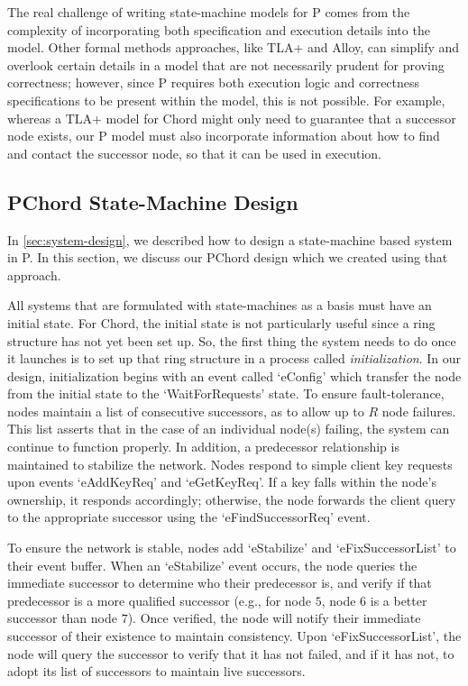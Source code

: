 \documentclass[conference]{IEEEtran}
\begin{document}
The real challenge of writing state-machine models for P comes from the complexity of incorporating both specification and execution details into the model. Other formal methods approaches, like TLA+ and Alloy, can simplify and overlook certain details in a model that are not necessarily prudent for proving correctness; however, since P requires both execution logic and correctness specifications to be present within the model, this is not possible. For example, whereas a TLA+ model for Chord might only need to guarantee that a successor node exists, our P model must also incorporate information about how to find and contact the successor node, so that it can be used in execution. 

\subsection{PChord State-Machine Design}
In \autoref{sec:system-design}, we described how to design a state-machine based system in P. In this section, we discuss our PChord design which we created using that approach.


All systems that are formulated with state-machines as a basis must have an initial state. For Chord, the initial state is not particularly useful since a ring structure has not yet been set up. So, the first thing the system needs to do once it launches is to set up that ring structure in a process called \textit{initialization}. In our design, initialization begins with an event called `eConfig' which transfer the node from the initial state to the `WaitForRequests' state. To ensure fault-tolerance, nodes maintain a list of consecutive successors, as to allow up to $R$ node failures. This list asserts that in the case of an individual node(s) failing, the system can continue to function properly. In addition, a predecessor relationship is maintained to stabilize the network. Nodes respond to simple client key requests upon events `eAddKeyReq' and `eGetKeyReq'. If a key falls within the node's ownership, it responds accordingly; otherwise, the node forwards the client query to the appropriate successor using the `eFindSuccessorReq' event. 

To ensure the network is stable, nodes add `eStabilize' and `eFixSuccessorList' to their event buffer. When an `eStabilize' event occurs, the node queries the immediate successor to determine who their predecessor is, and verify if that predecessor is a more qualified successor (e.g., for node $5$, node $6$ is a better successor than node $7$). Once verified, the node will notify their immediate successor of their existence to maintain consistency. Upon `eFixSuccessorList', the node will query the successor to verify that it has not failed, and if it has not, to adopt its list of successors to maintain live successors. 
\end{document}
